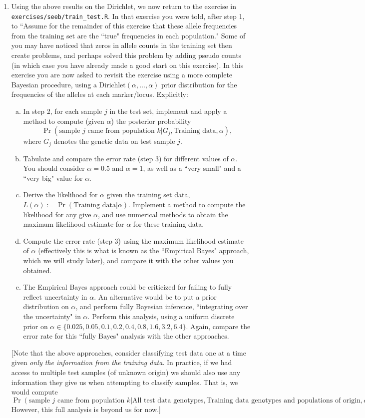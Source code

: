 \documentclass[12pt]{article}
\def\train{\text{Training data}}
\begin{document}
\begin{enumerate}
\item Using the above results on the Dirichlet, we now return to the exercise in \verb|exercises/seeb/train_test.R|. In that exercise you were told, after step 1, to ``Assume for the remainder of this exercise that these allele frequencies from the training set are the ``true" frequencies in each population." Some of you may have noticed that zeros in allele
counts in the training set then create problems, and perhaps solved this problem by adding pseudo counts (in which case you have already
made a good start on this exercise). In this exercise you are now asked to revisit the exercise using a more complete Bayesian procedure, 
using a Dirichlet$(\alpha,\dots,\alpha)$ prior distribution for the frequencies of the alleles at each marker/locus. Explicitly:
\begin{enumerate}[a)]
\item In step 2, for each sample $j$ in the test set, implement and apply a method to compute (given $\alpha$) the posterior probability 
$$\Pr(\text{sample $j$ came from population $k$} | G_j, \text{Training data}, \alpha),$$ 
where $G_j$ denotes the genetic data on test sample $j$. 
\item  Tabulate and compare the error rate (step 3) for different values of $\alpha$. 
You should consider $\alpha=0.5$ and $\alpha=1$, as well as a ``very small" and a ``very big" value for $\alpha$.
\item Derive the likelihood for $\alpha$ given the training set data, $L(\alpha) :=\Pr(\train | \alpha)$. Implement a method to compute
the likelihood for any give $\alpha$, and use numerical methods to obtain the maximum likelihood estimate for $\alpha$
for these training data.
\item Compute the error rate (step 3) using the maximum likelihood estimate of $\alpha$ (effectively this is what is known as the ``Empirical Bayes" approach, which we will study later), and compare it with the other values you obtained.
\item The Empirical Bayes approach could be criticized for failing to fully reflect uncertainty in $\alpha$. An alternative would be to put a prior distribution on $\alpha$, and perform 
fully Bayesian inference, ``integrating over the uncertainty" in $\alpha$. Perform this analysis, using a uniform discrete prior on $\alpha \in \{0.025,0.05,0.1,0.2,0.4,0.8,1.6,3.2,6.4\}$. Again, compare the error rate for this ``fully Bayes" analysis with the other approaches. 
\end{enumerate}
 [Note that the above approaches, consider classifying test data one at a time given {\it only the information from the training data}.
 In practice, if we had access to multiple test samples (of unknown origin) we should also use any information they
 give us when attempting to classify samples. That is, we would
compute 
$$\Pr(\text{sample $j$ came from population $k$} | \text{All test data genotypes}, \text{Training data genotypes and populations of origin},\alpha).$$ However, this full analysis is beyond us for now.]




\end{enumerate}
\end{document}
